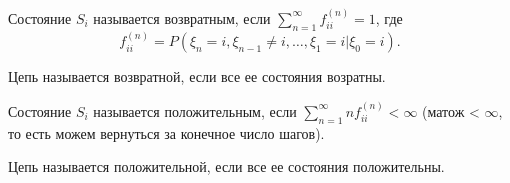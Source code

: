 \begin{definition}
  Состояние $S_i$ называется возвратным, если $\sum_{n=1}^{\infty} f_{ii}^{(n)} = 1$,
  где 
  \[
    f_{ii}^{(n)} = P(\xi_n = i, \xi_{n-1} \neq i, \dots, \xi_1 = i | \xi_0 = i).
  \]
\end{definition}

\begin{definition}
  Цепь называется возвратной, если все ее состояния возратны.
\end{definition}

\begin{definition}
  Состояние $S_i$ называется положительным, если $\sum_{n=1}^{\infty} n f_{ii}^{(n)} < \infty$
  (матож < $\infty$, то есть можем вернуться за конечное число шагов).
\end{definition}

\begin{definition}
  Цепь называется положительной, если все ее состояния положительны.
\end{definition}


